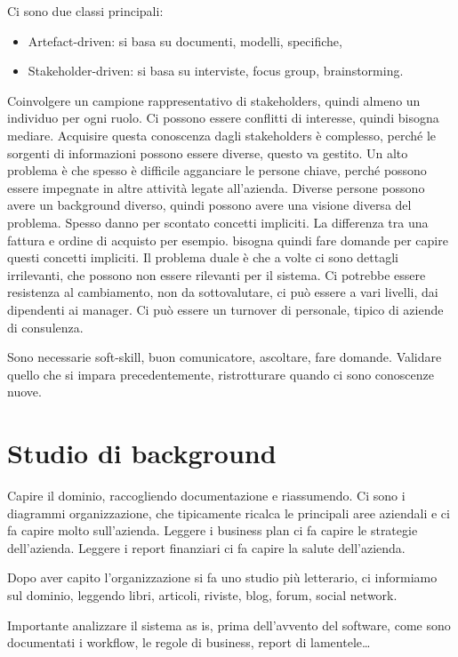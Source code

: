 \documentclass[oneside,a4paper,11pt]{book}
\theoremstyle{italicstyle}
\theoremstyle{normStyle}
\begin{document}
Ci sono due classi principali:
\begin{itemize}
  \item Artefact-driven: si basa su documenti, modelli, specifiche,
  \item Stakeholder-driven: si basa su interviste, focus group, brainstorming.
\end{itemize}
Coinvolgere un campione rappresentativo di stakeholders, quindi almeno un 
individuo per ogni ruolo. Ci possono essere conflitti di interesse, quindi
bisogna mediare.
Acquisire questa conoscenza dagli stakeholders è complesso, perché le sorgenti 
di informazioni possono essere diverse, questo va gestito.
Un alto problema è che spesso è difficile agganciare le persone chiave, 
perché possono essere impegnate in altre attività legate all'azienda.
Diverse persone possono avere un background diverso, quindi possono
avere una visione diversa del problema.
Spesso danno per scontato concetti impliciti. La differenza tra una fattura e 
ordine di acquisto per esempio. bisogna quindi fare domande per capire
questi concetti impliciti.
Il problema duale è che a volte ci sono dettagli irrilevanti, che possono non 
essere rilevanti per il sistema. 
Ci potrebbe essere resistenza al cambiamento, non da sottovalutare, ci può 
essere a vari livelli, dai dipendenti ai manager. Ci può essere un 
turnover di personale, tipico di aziende di consulenza.

Sono necessarie soft-skill, buon comunicatore, ascoltare, fare domande.
Validare quello che si impara precedentemente, ristrotturare quando 
ci sono conoscenze nuove.

\section{Studio di background}
Capire il dominio, raccogliendo documentazione e riassumendo.
Ci sono i diagrammi organizzazione, che tipicamente ricalca le principali 
aree aziendali e ci fa capire molto sull'azienda. Leggere i business plan 
ci fa capire le strategie dell'azienda. Leggere i report finanziari ci fa capire la salute dell'azienda.

Dopo aver capito l'organizzazione si fa uno studio più letterario, ci informiamo sul 
dominio, leggendo libri, articoli, riviste, blog, forum, social network.

Importante analizzare il sistema as is, prima dell'avvento del software, come 
sono documentati i workflow, le regole di business, report di lamentele\dots
\end{document}
